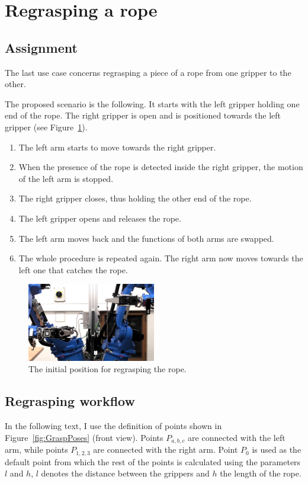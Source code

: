 \graphicspath{{Img/regrasping/}}

\section{Regrasping a rope}

    \subsection{Assignment}
        The last use case concerns regrasping a piece of a rope from one gripper to the other.

        The proposed scenario is the following.  It starts with the left gripper holding one end of the rope. The right gripper is open and is positioned towards the left gripper (see Figure~\ref{fig:RegraspInit}).
%
        \begin{enumerate}\itemsep0pt
            \item The left arm starts to move towards the right gripper.
            \item When the presence of the rope is detected inside the right gripper, the motion of the left arm is stopped.
            \item The right gripper closes, thus holding the other end of the rope.
            \item The left gripper opens and releases the rope.
            \item The left arm moves back and the functions of both arms are swapped.
            \item The whole procedure is repeated again. The right arm now moves towards the left one that catches the rope.
        \end{enumerate}

        \begin{figure}[h]
        \includegraphics[width=0.5\textwidth]{RegraspInit.png}
        \centering
        \caption{The initial position for regrasping the rope.}
        \label{fig:RegraspInit}
        \end{figure}

    \subsection{Regrasping workflow}
        In the following text, I use the definition of points shown in Figure~\ref{fig:GraspPoses} (front view). Points $P_{a,b,c}$ are connected with the left arm, while points $P_{1,2,3}$ are connected with the right arm. Point $P_0$ is used as the default point from which the rest of the points is calculated using the parameters $l$ and $h$, $l$ denotes the distance between the grippers and $h$ the length of the rope.


